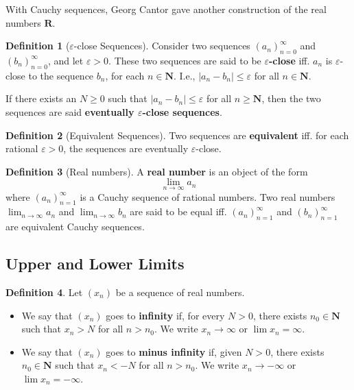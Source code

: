 \documentclass[tikz,12pt,a4paper]{article}
\theoremstyle{definition}
\newtheorem{proposition}[theorem]{Proposition}
\newtheorem{definition}{Definition}[section]
\begin{document}
With Cauchy sequences, Georg Cantor gave another construction of the real numbers $\textbf{R}$.

\begin{definition}[$\varepsilon$-close Sequences]
  Consider two sequences $(a_n)_{n=0}^\infty$ and $(b_n)_{n=0}^\infty$, and let $\varepsilon > 0$. These two sequences are said to be \textbf{$\varepsilon$-close} iff. $a_n$ is $\varepsilon$-close to the sequence $b_n$, for each $n \in \textbf{N}$. I.e., $|a_n - b_n| \leq \varepsilon$ for all $n \in \textbf{N}$.

  If there exists an $N \geq 0$ such that $|a_n - b_n| \leq \varepsilon$ for all $n \geq \textbf{N}$, then the two sequences are said \textbf{eventually $\varepsilon$-close sequences}.
\end{definition}

\begin{definition}[Equivalent Sequences]
  Two sequences are \textbf{equivalent} iff. for each rational $\varepsilon > 0$, the sequences are eventually $\varepsilon$-close.
\end{definition}


\begin{definition}[Real numbers]
  A \textbf{real number} is an object of the form
  \[
    \lim_{n \to \infty} a_n
  \]
  where $(a_n)_{n=1}^\infty$ is a Cauchy sequence of rational numbers. Two real numbers $\lim_{n \to \infty} a_n$ and $\lim_{n \to \infty} b_n$ are said to be equal iff. $(a_n)_{n=1}^\infty$ and $(b_n)_{n=1}^\infty$ are equivalent Cauchy sequences.
\end{definition}

\subsection{Upper and Lower Limits}

\begin{definition}
	Let $(x_n)$ be a sequence of real numbers. 
	\begin{itemize}
		\item We say that $(x_n)$ goes to \textbf{infinity} if, for every $N > 0$, there exists $n_0 \in \textbf{N}$ such that $x_n > N$ for all $n > n_0$. We write $x_n \longrightarrow \infty$ or $\lim x_n = \infty$.
		\item We say that $(x_n)$ goes to \textbf{minus infinity} if, given $N > 0$, there exists $n_0 \in \textbf{N}$ such that $x_n < -N$ for all $n > n_0$. We write $x_n \longrightarrow - \infty$ or $\lim x_n = - \infty$.
	\end{itemize}
\end{definition}
\end{document}
